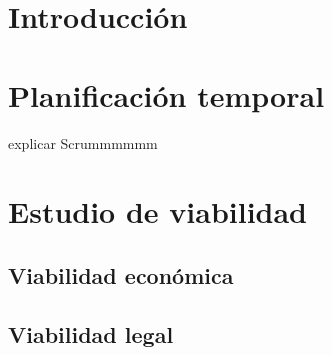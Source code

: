 
\section{Introducción}

\section{Planificación temporal}
explicar Scrummmmmm
\section{Estudio de viabilidad}

\subsection{Viabilidad económica}

\subsection{Viabilidad legal}


